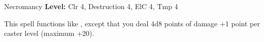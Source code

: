 {Necromancy}
{
	\textbf{Level:}
	Clr 4, Destruction 4, ElC 4, Tmp 4\\
}
{
	This spell functions like , except that you deal 4d8 points of damage +1 point per caster level (maximum +20).

}
